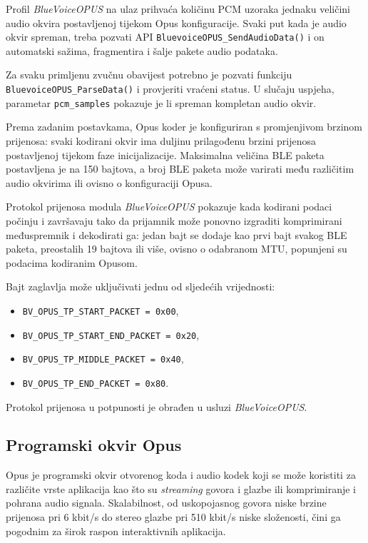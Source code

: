 Profil \textit{BlueVoiceOPUS} na ulaz prihvaća količinu PCM uzoraka jednaku veličini audio okvira postavljenoj tijekom Opus konfiguracije. Svaki put kada je audio okvir spreman, treba pozvati API \lstinline|BluevoiceOPUS_SendAudioData()| i on automatski sažima, fragmentira i šalje pakete audio podataka.

Za svaku primljenu zvučnu obavijest potrebno je pozvati funkciju \newline \lstinline|BluevoiceOPUS_ParseData()| i provjeriti vraćeni status. U slučaju uspjeha, parametar \lstinline|pcm_samples| pokazuje je li spreman kompletan audio okvir.

Prema zadanim postavkama, Opus koder je konfiguriran s promjenjivom brzinom prijenosa: svaki kodirani okvir ima  duljinu prilagođenu brzini prijenosa postavljenoj tijekom faze inicijalizacije. Maksimalna veličina BLE paketa postavljena je na 150 bajtova, a broj BLE paketa može varirati među različitim audio okvirima ili ovisno o konfiguraciji Opusa.

Protokol prijenosa modula \textit{BlueVoiceOPUS} pokazuje kada kodirani podaci počinju i završavaju tako da prijamnik može ponovno izgraditi komprimirani međuspremnik i dekodirati ga: jedan bajt se dodaje kao prvi bajt svakog BLE paketa, preostalih 19 bajtova ili više, ovisno o odabranom MTU, popunjeni su podacima kodiranim Opusom.

Bajt zaglavlja može uključivati jednu od sljedećih vrijednosti:
\begin{itemize}
	\item \lstinline|BV_OPUS_TP_START_PACKET = 0x00|,
	\item \lstinline|BV_OPUS_TP_START_END_PACKET = 0x20|,
	\item \lstinline|BV_OPUS_TP_MIDDLE_PACKET = 0x40|,
	\item \lstinline|BV_OPUS_TP_END_PACKET = 0x80|.
\end{itemize}

Protokol prijenosa u potpunosti je obrađen u usluzi \textit{BlueVoiceOPUS}.
\subsection{Programski okvir Opus}
Opus je programski okvir otvorenog koda i audio kodek koji se može koristiti za različite vrste aplikacija kao što su \textit{streaming} govora i glazbe ili komprimiranje i pohrana audio signala. Skalabilnost, od uskopojasnog govora niske brzine prijenosa pri 6 kbit/s do stereo glazbe pri 510 kbit/s niske složenosti, čini ga pogodnim za širok raspon interaktivnih aplikacija.

